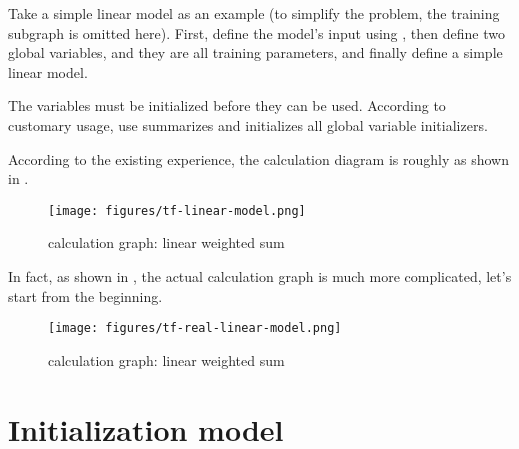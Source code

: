 \begin{content}

Take a simple linear model as an example (to simplify the problem, the training subgraph is omitted here). First, define the model's input using , then define two global variables, and they are all training parameters, and finally define a simple linear model.


The variables must be initialized before they can be used. According to customary usage, use 
 summarizes and initializes all global variable initializers.


According to the existing experience, the calculation diagram is roughly as shown in .

\begin{figure}[!h]
\centering
\texttt{[image: figures/tf-linear-model.png]}
\caption{calculation graph: linear weighted sum}
 \label{fig:tf-linear-model}
\end{figure}

In fact, as shown in , the actual calculation graph is much more complicated, let's start from the beginning.

\begin{figure}[!h]
\centering
\texttt{[image: figures/tf-real-linear-model.png]}
\caption{calculation graph: linear weighted sum}
 \label{fig:tf-real-linear-model}
\end{figure}

\end{content}

\section{Initialization model}

